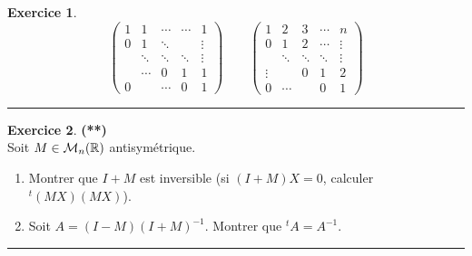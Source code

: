 \documentclass[a4paper,11pt]{article}
\theoremstyle{definition}
\newtheorem{exo}{Exercice} %
\begin{document}
\begin{minipage}{1\linewidth}
\begin{minipage}[t]{0.48\linewidth}
\begin{exo}
			$$
			\begin{pmatrix}
			1 & 1 & \cdots &\cdots & 1 \\
			0 & 1 & \ddots & & \vdots  \\
			& \ddots & \ddots & \ddots &  \vdots \\
			& \cdots & 0 & 1 & 1 \\
			0 & & \cdots & 0 & 1
			\end{pmatrix}
			\qquad 
			\begin{pmatrix}
			1 & 2 & 3 & \cdots & n \\
			0 & 1 & 2 & \cdots & \vdots \\
			& \ddots & \ddots & \ddots &  \vdots \\
			\vdots &  & 0 & 1 & 2 \\
			0 & \cdots & & 0 & 1
			\end{pmatrix}
			$$
			\centering
			\rule{1\linewidth}{0.6pt}
		\end{exo}
		
		
		\begin{exo}\textbf{(**)}\quad\\%
			Soit $M \in \mathcal{M}_n(\mathbb{R})$ antisymétrique.
			
			\begin{enumerate}
				\item Montrer que $I+M$ est inversible (si $(I+M)X = 0$, calculer ${}^t\!(MX)(MX)$).
				\item Soit $A = (I-M)(I+M)^{-1}$. Montrer que ${}^t\!A = A^{-1}$.
			\end{enumerate}
		
			\centering
			\rule{1\linewidth}{0.6pt}
		\end{exo}
		
		
		
		
	\end{minipage}
\end{minipage}
\newpage
\end{document}
